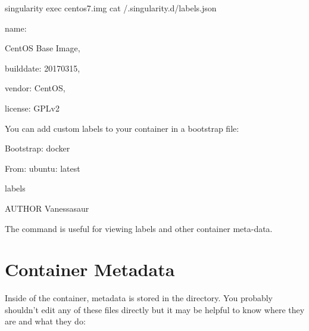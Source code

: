 \documentclass[letterpaper,10pt,english]{sphinxmanual}
\begin{document}
%
\begin{sphinxVerbatim}[commandchars=\\\{\}]
singularity exec centos7.img cat /.singularity.d/labels.json

\PYGZob{} \PYGZdq{}name\PYGZdq{}:

      \PYGZdq{}CentOS Base Image\PYGZdq{},

       \PYGZdq{}build\PYGZhy{}date\PYGZdq{}: \PYGZdq{}20170315\PYGZdq{},

       \PYGZdq{}vendor\PYGZdq{}: \PYGZdq{}CentOS\PYGZdq{},

       \PYGZdq{}license\PYGZdq{}: \PYGZdq{}GPLv2\PYGZdq{}

\PYGZcb{}
\end{sphinxVerbatim}

You can add custom labels to your container in a bootstrap file:

%
\begin{sphinxVerbatim}[commandchars=\\\{\}]
Bootstrap: docker

From: ubuntu: latest



\PYGZpc{}labels

AUTHOR Vanessasaur
\end{sphinxVerbatim}

The  command is useful for viewing labels and other container meta-data.


\section{Container Metadata}
\label{\detokenize{environment_and_metadata:container-metadata}}
Inside of the container, metadata is stored in the  directory. You
probably shouldn’t edit any of these files directly but it may be
helpful to know where they are and what they do:
\end{document}
